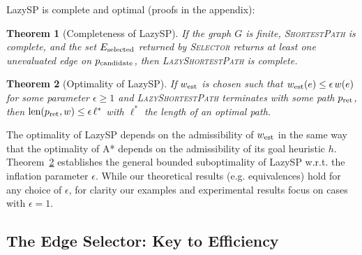 \documentclass[nobib]{tufte-book}
\newcommand{\ms}[1]{\mbox{\scriptsize #1}}
\newtheorem{theorem}{Theorem}
\begin{document}
LazySP is complete and optimal
(proofs in the appendix):

\begin{theorem}[Completeness of LazySP]
If the graph $G$ is finite,
\textsc{ShortestPath} is complete,
and the set $E_{\ms{selected}}$
returned by \textsc{Selector}
returns at least one unevaluated edge on $p_{\ms{candidate}}$,
then \textsc{LazyShortestPath} is complete.
\label{thm:lazy-completeness}
\end{theorem}

\begin{theorem}[Optimality of LazySP]
If $w_{\ms{est}}$ is chosen such that
$w_{\ms{est}}(e) \leq \epsilon \, w(e)$ for some parameter
$\epsilon \geq 1$ and
\textsc{LazyShortestPath} terminates
with some path $p_{\ms{ret}}$,
then $\mbox{len}(p_{\ms{ret}}, w) \leq \epsilon \, \ell^*$
with $\ell^*$ the length of an optimal path.
\label{thm:lazy-optimality}
\end{theorem}

The optimality of LazySP depends on the admissibility of
$w_{\ms{est}}$
in the same way that the optimality of A* depends on
the admissibility of its goal heuristic $h$.
Theorem~\ref{thm:lazy-optimality} establishes the general
bounded suboptimality of LazySP
w.r.t. the inflation parameter $\epsilon$.
While our theoretical results (e.g. equivalences)
hold for any choice of $\epsilon$,
for clarity our examples and experimental results
focus on cases with $\epsilon = 1$.

\subsection{The Edge Selector: Key to Efficiency}
\end{document}
